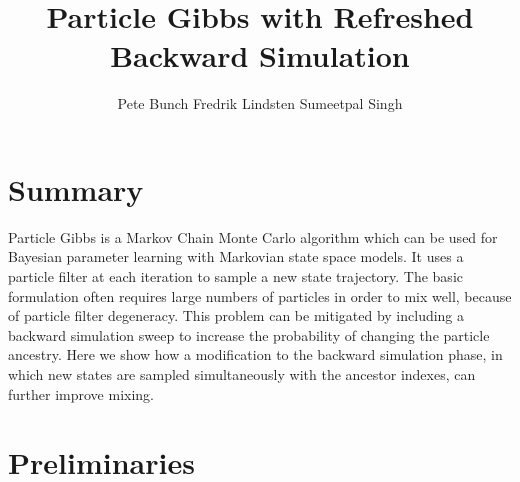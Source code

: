\documentclass[landscape,a0,plainboxedsections]{sciposter}
\title{Particle Gibbs with Refreshed Backward Simulation}
\author{Pete Bunch \qquad Fredrik Lindsten \qquad Sumeetpal Singh}
\institute{Department of Engineering, University of Cambridge, Trumpington Street, Cambridge, CB2 1PZ, UK}
\begin{document}
\maketitle
\begin{multicols}{4}

\section{Summary}
Particle Gibbs is a Markov Chain Monte Carlo algorithm which can be used for Bayesian parameter learning with Markovian state space models. It uses a particle filter at each iteration to sample a new state trajectory. The basic formulation often requires large numbers of particles in order to mix well, because of particle filter degeneracy. This problem can be mitigated by including a backward simulation sweep to increase the probability of changing the particle ancestry. Here we show how a modification to the backward simulation phase, in which new states are sampled simultaneously with the ancestor indexes, can further improve mixing.
%
%
%
\section{Preliminaries}

\end{multicols}
\end{document}
